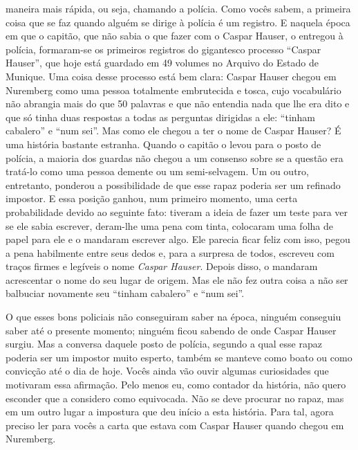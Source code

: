 maneira mais rápida, ou seja, chamando a polícia. Como vocês sabem, a
primeira coisa que se faz quando alguém se dirige à polícia é um
registro. E naquela época em que o capitão, que não sabia o que fazer
com o Caspar Hauser, o entregou à polícia, formaram-se os primeiros
registros do gigantesco processo ``Caspar Hauser'', que hoje está
guardado em 49 volumes no Arquivo do Estado de Munique. Uma coisa desse
processo está bem clara: Caspar Hauser chegou em Nuremberg como uma
pessoa totalmente embrutecida e tosca, cujo vocabulário não abrangia
mais do que 50 palavras e que não entendia nada que lhe era dito e que
só tinha duas respostas a todas as perguntas dirigidas a ele: ``tinham
cabalero'' e ``num sei''. Mas como ele chegou a ter o nome de Caspar
Hauser? É uma história bastante estranha. Quando o capitão o levou para
o posto de polícia, a maioria dos guardas não chegou a um consenso sobre
se a questão era tratá-lo como uma pessoa demente ou um semi-selvagem.
Um ou outro, entretanto, ponderou a possibilidade de que esse rapaz
poderia ser um refinado impostor. E essa posição ganhou, num primeiro
momento, uma certa probabilidade devido ao seguinte fato: tiveram a
ideia de fazer um teste para ver se ele sabia escrever, deram-lhe uma
pena com tinta, colocaram uma folha de papel para ele e o mandaram
escrever algo. Ele parecia ficar feliz com isso, pegou a pena habilmente
entre seus dedos e, para a surpresa de todos, escreveu com traços firmes
e legíveis o nome \emph{Caspar Hauser}. Depois disso, o mandaram
acrescentar o nome do seu lugar de origem. Mas ele não fez outra coisa a
não ser balbuciar novamente seu ``tinham cabalero'' e ``num sei''.

O que esses bons policiais não conseguiram saber na época, ninguém
conseguiu saber até o presente momento; ninguém ficou sabendo de onde
Caspar Hauser surgiu. Mas a conversa daquele posto de polícia, segundo a
qual esse rapaz poderia ser um impostor muito esperto, também se manteve
como boato ou como convicção até o dia de hoje. Vocês ainda vão ouvir
algumas curiosidades que motivaram essa afirmação. Pelo menos eu, como
contador da história, não quero esconder que a considero como
equivocada. Não se deve procurar no rapaz, mas em um outro lugar a
impostura que deu início a esta história. Para tal, agora preciso ler
para vocês a carta que estava com Caspar Hauser quando chegou em
Nuremberg.

